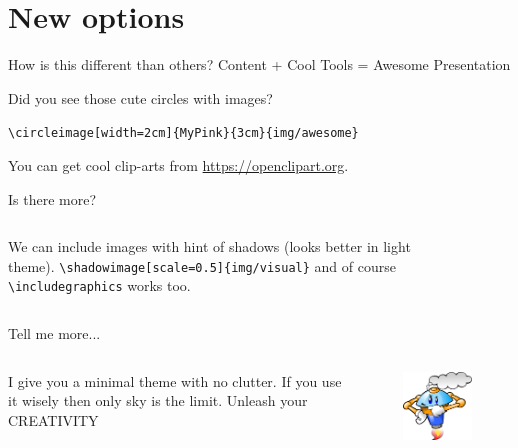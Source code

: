 \documentclass[xetex, aspectratio=169]{beamer}
\begin{document}
\section{New options}

\begin{frame}[fragile]{How is this different than others?}
\centering
	\alert{Content + Cool Tools = Awesome Presentation}\vspace*{\baselineskip}
	
		Did you see those cute circles with images?

\verb|\circleimage[width=2cm]{MyPink}{3cm}{img/awesome}| \vspace*{\baselineskip}


		
		You can get cool clip-arts from \url{https://openclipart.org}.

	
\end{frame}


\begin{frame}[fragile]{Is there more?}
	
\begin{columns}
	\centering
	We can include images with hint of shadows (looks better in light theme).
\verb|\shadowimage[scale=0.5]{img/visual}|
and of course \verb|\includegraphics| works too. 

	\centering
	\begin{figure}
	\end{figure}
\end{columns}

\end{frame}

\begin{frame}[fragile]{Tell me more...}
\centering 
\begin{columns}
	I give you a minimal theme with no clutter. If you use it wisely then only sky is the limit. 
	Unleash your {\Huge \alert{CREATIVITY}}
	\begin{figure}
		\includegraphics[width=4cm]{img/think}
	\end{figure}
\end{columns}

\end{frame}
\end{document}

